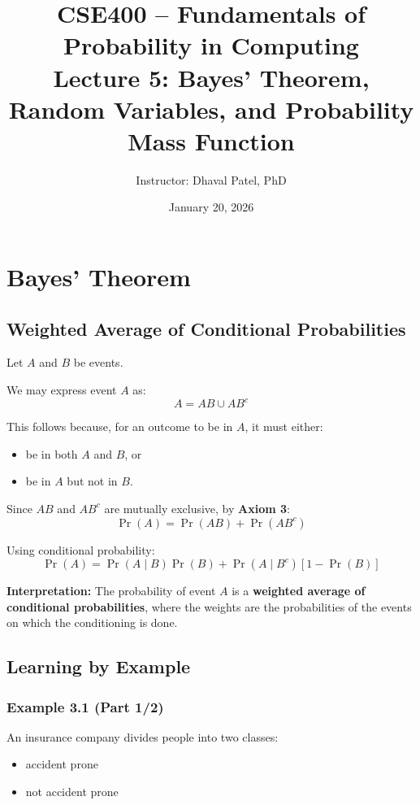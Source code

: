 \documentclass[11pt]{article}
\title{\textbf{CSE400 -- Fundamentals of Probability in Computing}\\
Lecture 5: Bayes' Theorem, Random Variables, and Probability Mass Function}
\author{Instructor: Dhaval Patel, PhD}
\date{January 20, 2026}
\begin{document}
\maketitle

\section{Bayes' Theorem}

\subsection{Weighted Average of Conditional Probabilities}

Let $A$ and $B$ be events.

We may express event $A$ as:
\[
A = AB \cup AB^c
\]

This follows because, for an outcome to be in $A$, it must either:
\begin{itemize}[leftmargin=1.5em]
    \item be in both $A$ and $B$, or
    \item be in $A$ but not in $B$.
\end{itemize}

Since $AB$ and $AB^c$ are mutually exclusive, by \textbf{Axiom 3}:
\[
\Pr(A) = \Pr(AB) + \Pr(AB^c)
\]

Using conditional probability:
\[
\Pr(A) = \Pr(A \mid B)\Pr(B) + \Pr(A \mid B^c)[1 - \Pr(B)]
\]

\textbf{Interpretation:}  
The probability of event $A$ is a \textbf{weighted average of conditional probabilities}, where the weights are the probabilities of the events on which the conditioning is done.

\subsection{Learning by Example}

\subsubsection*{Example 3.1 (Part 1/2)}

An insurance company divides people into two classes:
\begin{itemize}[leftmargin=1.5em]
    \item accident prone
    \item not accident prone
\end{itemize}
\end{document}

